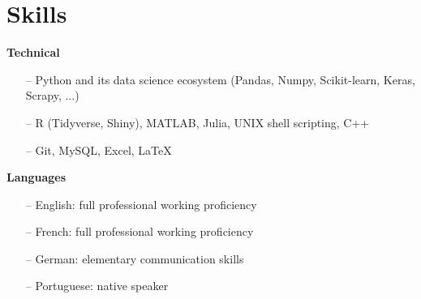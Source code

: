 \section{Skills} 

{\bf Technical} \\
\begin{itemize}
	\item[--] Python and its data science ecosystem (Pandas, Numpy, Scikit-learn, Keras, Scrapy, ...)
	\item[--] R (Tidyverse, Shiny), MATLAB, Julia, UNIX shell scripting, C++
	\item[--] Git, MySQL, Excel, \LaTeX
\end{itemize}

{\bf Languages} \\
\begin{itemize}
	\item[--] English: full professional working proficiency
	\item[--] French: full professional working proficiency
	\item[--] German: elementary communication skills
	\item[--] Portuguese: native speaker
\end{itemize}